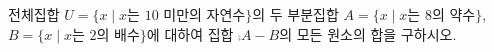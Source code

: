 전체집합 $U=\{x \mid x$는 $10$ 미만의 자연수$\}$의 두 부분집합 $A=\{x \mid x$는 $8$의 약수$\}$, $B=\{x \mid x$는 $2$의 배수$\}$에 대하여 집합 $\comp{A}-B$의 모든 원소의 합을 구하시오.
